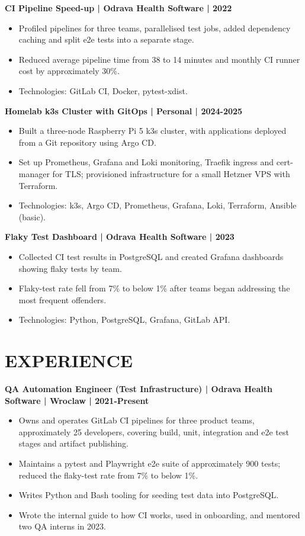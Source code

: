 \documentclass[11pt,a4paper]{article}
\begin{document}
\textbf{CI Pipeline Speed-up | Odrava Health Software | 2022}
\begin{itemize}
\item Profiled pipelines for three teams, parallelised test jobs, added dependency caching and split e2e tests into a separate stage.
\item Reduced average pipeline time from 38 to 14 minutes and monthly CI runner cost by approximately 30\%.
\item Technologies: GitLab CI, Docker, pytest-xdist.
\end{itemize}

\textbf{Homelab k3s Cluster with GitOps | Personal | 2024-2025}
\begin{itemize}
\item Built a three-node Raspberry Pi 5 k3s cluster, with applications deployed from a Git repository using Argo CD.
\item Set up Prometheus, Grafana and Loki monitoring, Traefik ingress and cert-manager for TLS; provisioned infrastructure for a small Hetzner VPS with Terraform.
\item Technologies: k3s, Argo CD, Prometheus, Grafana, Loki, Terraform, Ansible (basic).
\end{itemize}

\textbf{Flaky Test Dashboard | Odrava Health Software | 2023}
\begin{itemize}
\item Collected CI test results in PostgreSQL and created Grafana dashboards showing flaky tests by team.
\item Flaky-test rate fell from 7\% to below 1\% after teams began addressing the most frequent offenders.
\item Technologies: Python, PostgreSQL, Grafana, GitLab API.
\end{itemize}

\section*{EXPERIENCE}
\textbf{QA Automation Engineer (Test Infrastructure) | Odrava Health Software | Wroclaw | 2021-Present}
\begin{itemize}
\item Owns and operates GitLab CI pipelines for three product teams, approximately 25 developers, covering build, unit, integration and e2e test stages and artifact publishing.
\item Maintains a pytest and Playwright e2e suite of approximately 900 tests; reduced the flaky-test rate from 7\% to below 1\%.
\item Writes Python and Bash tooling for seeding test data into PostgreSQL.
\item Wrote the internal guide to how CI works, used in onboarding, and mentored two QA interns in 2023.
\end{itemize}
\end{document}
